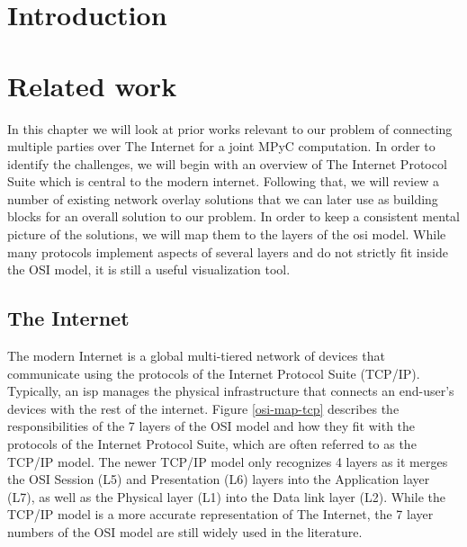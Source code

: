 \hypertarget{thesis__001-preamble.md}{}
\tableofcontents

\printnoidxglossary[type=\acronymtype,title=List of Abbreviations]
\listoffigures

\mainmatter

\hypertarget{thesis__010-intro.md}{}
\hypertarget{thesis__010-intro.md__introduction}{%
\chapter{Introduction}\label{thesis__010-intro.md__introduction}}

\hypertarget{thesis__020-related-work.md}{}
\hypertarget{thesis__020-related-work.md__related-work}{%
\chapter{Related work}\label{thesis__020-related-work.md__related-work}}

In this chapter we will look at prior works relevant to our problem of
connecting multiple parties over The Internet for a joint MPyC
computation. In order to identify the challenges, we will begin with an
overview of The Internet Protocol Suite which is central to the modern
internet. Following that, we will review a number of existing network
overlay solutions that we can later use as building blocks for an
overall solution to our problem. In order to keep a consistent mental
picture of the solutions, we will map them to the layers of the
\gls{osi} model. While many protocols implement aspects of several
layers and do not strictly fit inside the OSI model, it is still a
useful visualization tool.

\hypertarget{thesis__020-related-work.md__the-internet}{%
\section{The Internet}\label{thesis__020-related-work.md__the-internet}}

The modern Internet is a global multi-tiered network of devices that
communicate using the protocols of the Internet Protocol Suite (TCP/IP).
Typically, an \gls{isp} manages the physical infrastructure that
connects an end-user's devices with the rest of the internet. Figure
\ref{osi-map-tcp} describes the responsibilities of the 7 layers of the
OSI model and how they fit with the protocols of the Internet Protocol
Suite, which are often referred to as the TCP/IP model. The newer TCP/IP
model only recognizes 4 layers as it merges the OSI Session (L5) and
Presentation (L6) layers into the Application layer (L7), as well as the
Physical layer (L1) into the Data link layer (L2). While the TCP/IP
model is a more accurate representation of The Internet, the 7 layer
numbers of the OSI model are still widely used in the literature.


